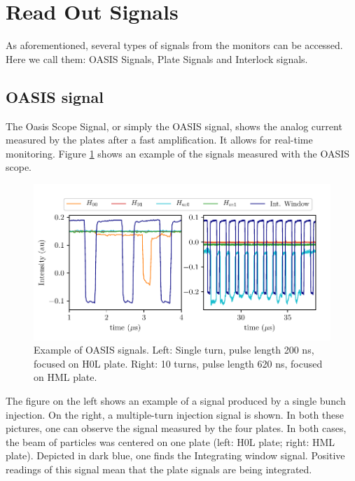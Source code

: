 \section{Read Out Signals}
\label{sec:H0HmSignals}

As aforementioned, several types of signals from the monitors can be accessed. Here we call them: OASIS Signals, Plate Signals and Interlock signals. 

\subsection{OASIS signal}
\label{sec:OasisSignal}

The Oasis Scope Signal, or simply the OASIS signal, shows the analog current measured by the plates after a fast amplification. It allows for real-time monitoring. Figure \ref{fig:OasisSignal} shows an example of the signals measured with the OASIS scope. 

\begin{figure}[h]
    \centering
    \includegraphics[width=1.0\columnwidth]{Figure_OasisSignals/OasisSignal.pdf}
    \caption{Example of OASIS signals. Left: Single turn, pulse length 200 ns, focused on H0L plate. Right: 10 turns, pulse length 620 ns, focused on HML plate. }
    \label{fig:OasisSignal}
\end{figure}

The figure on the left shows an example of a signal produced by a single bunch injection. On the right, a multiple-turn injection signal is shown. In both these pictures, one can observe the signal measured by the four plates. In both cases, the beam of particles was centered on one plate (left: H0L plate; right: HML plate). Depicted in dark blue, one finds the Integrating window signal. Positive readings of this signal mean that the plate signals are being integrated.

